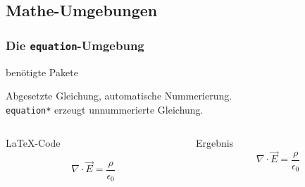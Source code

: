 \subsection{Mathe-Umgebungen}
\begin{frame}[fragile]
    \frametitle{Die \texttt{equation}-Umgebung 
        \hfill{}
    }
   \begin{block}{benötigte Pakete}
    \begin{lstverbatim}
        \usepackage{amsmath}
        \usepackage{amssymb}
        \usepackage{mathtools}
    \end{lstverbatim}
   \end{block}
    Abgesetzte Gleichung, automatische Nummerierung. \\
    \texttt{equation*} erzeugt unnummerierte Gleichung.
    \begin{columns}[T]
        \begin{column}{0.6\textwidth}
            \begin{block}{\LaTeX-Code}
                \begin{lstverbatim}
                \begin{equation}
                    \nabla \cdot \vec{E} = 
                    \frac{\rho} {\epsilon_0}
                    \label{eq:maxwell1}
                \end{equation}
                \end{lstverbatim}
            \end{block}
        \end{column}
        \begin{column}{0.35\textwidth}
            \begin{block}{Ergebnis}
                \begin{equation}
                    \nabla \cdot \vec{E} = 
                    \frac{\rho}{\epsilon_0}
                    \label{eq:maxwell1}
                \end{equation}
            \end{block}
        \end{column}
    \end{columns}
\end{frame}
